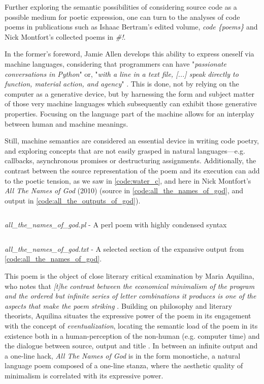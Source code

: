 Further exploring the semantic possibilities of considering source code as a possible medium for poetic expression, one can turn to the analyses of code poems in publications such as Ishaac Bertram's edited volume, \emph{code \{poems\}} and Nick Montfort's collected poems in \emph{\#!}.

In the former's foreword, Jamie Allen develops this ability to express oneself via machine languages, considering that programmers can have "\emph{passionate conversations in Python}" or, "\emph{with a line in a text file, [...] speak directly to function, material action, and agency}" \citep{bertram_code_2012}. This is done, not by relying on the computer as a generative device, but by harnessing the form and subject matter of those very machine languages which subsequently can exhibit those generative properties. Focusing on the language part of the machine allows for an interplay between human and machine meanings.

Still, machine semantics are considered an essential device in writing code poetry, and exploring concepts that are not easily grasped in natural languages—e.g. callbacks, asynchronous promises or destructuring assignments. Additionally, the contrast between the source representation of the poem and its execution can add to the poetic tension, as we saw in \autoref{code:water_c}, and here in Nick Montfort's \emph{All The Names of God} (2010) (source in \autoref{code:all_the_names_of_god}, and output in \autoref{code:all_the_outputs_of_god}).

\begin{listing}
  \inputminted{perl}{./corpus/all_the_names_of_god.pl}
  \caption{\emph{all\_the\_names\_of\_god.pl} - A perl poem with highly condensed syntax \citep{montfort_shebang_2014}}
  \label{code:all_the_names_of_god}
\end{listing}

\begin{listing}
  \inputminted{text}{./corpus/all_the_names_of_god.txt}
  \caption{\emph{all\_the\_names\_of\_god.txt} - A selected section of the expansive output from \ref{code:all_the_names_of_god}.}
  \label{code:all_the_outputs_of_god}
\end{listing}

This poem is the object of close literary critical examination by Maria Aquilina, who notes that \emph{[t]he contrast between the economical minimalism of the program and the ordered but infinite series of letter combinations it produces is one of the aspects that make the poem striking} \citep{aquilina_computational_2015}. Building on philosophy and literary theorists, Aquilina situates the expressive power of the poem in its engagement with the concept of \emph{eventualization}, locating the semantic load of the poem in its existence both in a human-perception of the non-human (e.g. computer time) and the dialogue between source, output and title \citep{aquilina_computational_2015}. In between an infinite output and a one-line hack, \emph{All The Names of God} is in the form monostiche, a natural language poem composed of a one-line stanza, where the aesthetic quality of minimalism is correlated with its expressive power.

